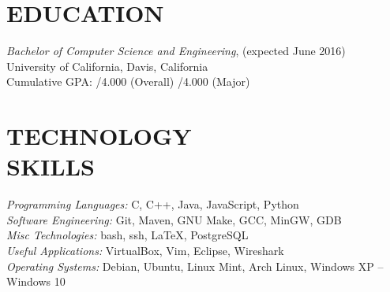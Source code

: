 \documentclass[line, letterpaper, 10pt]{res}
\begin{document}
\address{jmmcgee@ucdavis.edu | (323) 557-8647}

\begin{resume}


\section{EDUCATION}
    {\sl Bachelor of Computer Science and Engineering}, (expected June 2016) \\
    University of California, Davis, California \\
    Cumulative GPA: /4.000 (Overall) /4.000 (Major)

\section{TECHNOLOGY \\ SKILLS}
    {\sl Programming Languages:}  C, C++, Java, JavaScript, Python \\
    {\sl Software Engineering:} Git, Maven, GNU Make, GCC, MinGW, GDB \\
    {\sl Misc Technologies:} bash, ssh, LaTeX, PostgreSQL \\
    {\sl Useful Applications:} VirtualBox, Vim, Eclipse, Wireshark \\
    {\sl Operating Systems:} Debian, Ubuntu, Linux Mint, Arch Linux, Windows XP -- Windows 10


\end{resume}
\end{document}
